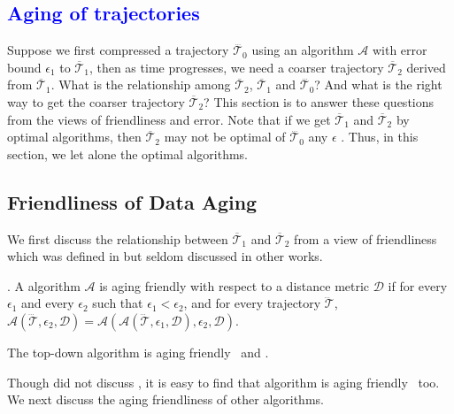 
\textcolor{blue}{\section{Aging of trajectories}}

Suppose we first compressed a trajectory $\dddot{\mathcal{T}_0}$ using an \lsa algorithm $\mathcal{A}$ with error bound $\epsilon_1$ to $\overline{\mathcal{T}}_1$, then as time progresses, we need a coarser trajectory $\overline{\mathcal{T}}_2$ derived from $\overline{\mathcal{T}}_1$. 
What is the relationship among $\overline{\mathcal{T}}_2$, $\overline{\mathcal{T}}_1$ and $\dddot{\mathcal{T}_0}$? And what is the right way to get the coarser trajectory $\overline{\mathcal{T}}_2$?
%
This section is to answer these questions from the views of friendliness and error.
Note that if we get $\overline{\mathcal{T}}_1$ and $\overline{\mathcal{T}}_2$ by optimal algorithms, then $\overline{\mathcal{T}}_2$ may not be optimal of $\dddot{\mathcal{T}_0}$ \wrt any $\epsilon$ \cite{Cao:Spatio}. Thus, in this section, we let alone the optimal algorithms.

\subsection{Friendliness of Data Aging}
We first discuss the relationship between $\overline{\mathcal{T}}_1$ and $\overline{\mathcal{T}}_2$ from a view of friendliness which was defined in \cite{Cao:Spatio} but seldom discussed in other works.
	
. {A \lsa algorithm $\mathcal{A}$ is aging friendly with respect to a distance metric $\mathcal{D}$ if for every $\epsilon_1$ and every $\epsilon_2$ such that $\epsilon_1 < \epsilon_2$, and for every trajectory $\dddot{\mathcal{T}}$, $\mathcal{A}(\dddot{\mathcal{T}}, \epsilon_2, \mathcal{D})= \mathcal{A}(\mathcal{A}(\dddot{\mathcal{T}}, \epsilon_1, \mathcal{D}), \epsilon_2, \mathcal{D})$.}


\begin{theorem}
	\label{theo-aging-tp}
	The top-down algorithm \dpa is aging friendly \wrt~\ped and \sed\cite{Cao:Spatio}.
\end{theorem}
	
Though \cite{Cao:Spatio} did not discuss \dad, it is easy to find that algorithm \dpa is aging friendly \wrt~\dad too. 
We next discuss the aging friendliness of other algorithms.


